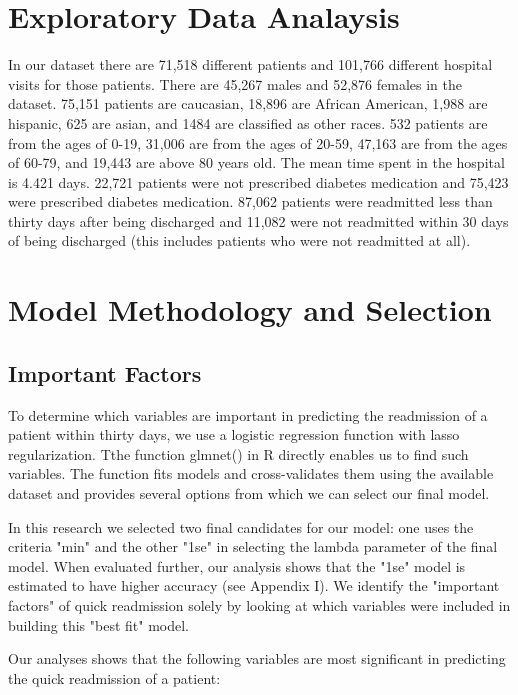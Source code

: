 \documentclass{article}
\begin{document}
\section{Exploratory Data Analaysis}
In our dataset there are 71,518 different patients and 101,766 different hospital visits for those patients. There are 45,267 males and 52,876 females in the dataset. 75,151 patients are caucasian, 18,896 are African American, 1,988 are hispanic, 625 are asian, and 1484 are classified as other races. 532 patients are from the ages of 0-19, 31,006 are from the ages of 20-59, 47,163 are from the ages of 60-79, and 19,443 are above 80 years old. The mean time spent in the hospital is 4.421 days. 22,721 patients were not prescribed diabetes medication and 75,423 were prescribed diabetes medication. 87,062  patients were readmitted less than thirty days after being discharged and 11,082 were not readmitted within 30 days of being discharged (this includes patients who were not readmitted at all).
\section{Model Methodology and Selection}

\subsection{Important Factors}
To determine which variables are important in predicting the readmission of a patient within thirty days, we use a logistic regression function with lasso regularization. Tthe function glmnet() in R directly enables us to find such variables. The function fits models and cross-validates them using the available dataset and provides several options from which we can select our final model. \newline

In this research we selected two final candidates for our model: one uses the criteria "min" and the other "1se"  in selecting the lambda parameter of the final model. When evaluated further, our analysis shows that the "1se" model is estimated to have higher accuracy (see Appendix I). We identify the "important factors" of quick readmission solely by looking at which variables were included in building this "best fit" model. \newline

Our analyses shows that the following variables are most significant in predicting the quick readmission of a patient:
\end{document}
